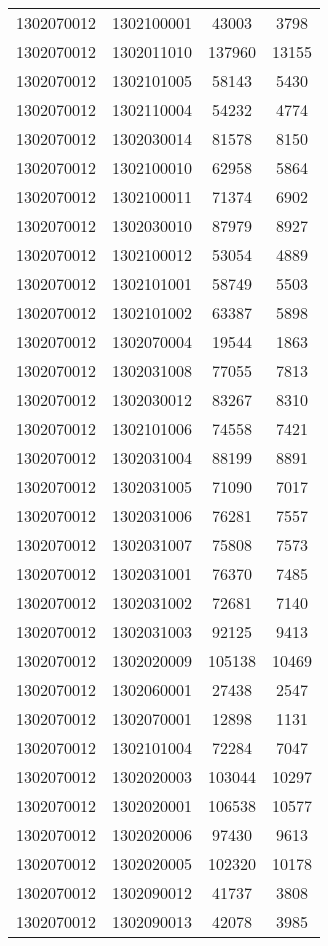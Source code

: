 \begin{longtable}{llcc}
1302070012 & 1302100001 & 43003 & 3798\\
1302070012 & 1302011010 & 137960 & 13155\\
1302070012 & 1302101005 & 58143 & 5430\\
1302070012 & 1302110004 & 54232 & 4774\\
1302070012 & 1302030014 & 81578 & 8150\\
1302070012 & 1302100010 & 62958 & 5864\\
1302070012 & 1302100011 & 71374 & 6902\\
1302070012 & 1302030010 & 87979 & 8927\\
1302070012 & 1302100012 & 53054 & 4889\\
1302070012 & 1302101001 & 58749 & 5503\\
1302070012 & 1302101002 & 63387 & 5898\\
1302070012 & 1302070004 & 19544 & 1863\\
1302070012 & 1302031008 & 77055 & 7813\\
1302070012 & 1302030012 & 83267 & 8310\\
1302070012 & 1302101006 & 74558 & 7421\\
1302070012 & 1302031004 & 88199 & 8891\\
1302070012 & 1302031005 & 71090 & 7017\\
1302070012 & 1302031006 & 76281 & 7557\\
1302070012 & 1302031007 & 75808 & 7573\\
1302070012 & 1302031001 & 76370 & 7485\\
1302070012 & 1302031002 & 72681 & 7140\\
1302070012 & 1302031003 & 92125 & 9413\\
1302070012 & 1302020009 & 105138 & 10469\\
1302070012 & 1302060001 & 27438 & 2547\\
1302070012 & 1302070001 & 12898 & 1131\\
1302070012 & 1302101004 & 72284 & 7047\\
1302070012 & 1302020003 & 103044 & 10297\\
1302070012 & 1302020001 & 106538 & 10577\\
1302070012 & 1302020006 & 97430 & 9613\\
1302070012 & 1302020005 & 102320 & 10178\\
1302070012 & 1302090012 & 41737 & 3808\\
1302070012 & 1302090013 & 42078 & 3985\\

\end{longtable}
